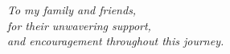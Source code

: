 
\textit{To my family and friends,\\ for their unwavering support,\\ and encouragement throughout this journey.}